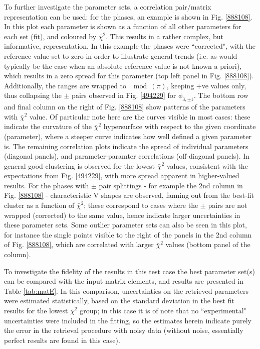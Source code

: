 \documentclass[10pt]{article}
\begin{document}

To further investigate the parameter sets, a correlation pair/matrix representation can be used: for the phases, an example is shown in Fig. \ref{888108}. In this plot each parameter is shown as a function of all other parameters for each set (fit), and coloured by $\bar{\chi}^2$. This results in a rather complex, but informative, representation. In this example the phases were ``corrected", with the reference value set to zero in order to illustrate general trends (i.e. as would typically be the case when an absolute reference value is not known a priori), which results in a zero spread for this parameter (top left panel in Fig. \ref{888108}). Additionally, the ranges are wrapped to $\mod(\pi)$, keeping +ve values only, thus collapsing the $\pm$ pairs observed in Fig. \ref{494229} for $\phi_{3,\pm1}$. The bottom row and final column on the right of Fig. \ref{888108} show patterns of the parameters with $\bar{\chi}^2$ value. Of particular note here are the curves visible in most cases: these indicate the curvature of the $\bar{\chi}^2$ hypersurface with respect to the given coordinate (parameter), where a steeper curve indicates how well defined a given parameter is. The remaining correlation plots indicate the spread of individual parameters (diagonal panels), and parameter-paramter correlations (off-diagonal panels). In general good clustering is observed for the lowest $\bar{\chi}^2$ values, %
consistent with the expectations from Fig. \ref{494229}, with more spread apparent in higher-valued results. For the phases with $\pm$ pair splittings - for example the 2nd column in Fig. \ref{888108} - characteristic V shapes are observed, fanning out from the best-fit cluster as a function of $\bar{\chi}^2$; these correspond to cases where the $\pm$ pairs are not wrapped (corrected) to the same value, hence indicate larger uncertainties in these parameter sets. Some outlier parameter sets can also be seen in this plot, for instance the single points visible to the right of the panels in the 2nd column of Fig. \ref{888108}, which are correlated with larger $\bar{\chi}^2$ values (bottom panel of the column).

To investigate the fidelity of the results in this test case the best parameter set(s) can be compared with the input matrix elements, and results are presented in Table \ref{tab:matE}. In this comparison, uncertainties on the retrieved parameters were estimated statistically, based on the standard deviation in the best fit results for the lowest $\bar{\chi}^2$ group; in this case it is of note that no ``experimental" uncertainties were included in the fitting, so the estimates herein indicate purely the error in the retrieval procedure with noisy data (without noise, essentially perfect results are found in this case). 
\end{document}
